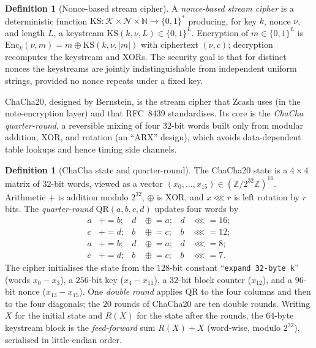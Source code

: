 \documentclass[11pt,a4paper]{article}
\theoremstyle{definition}
\newtheorem{definition}[theorem]{Definition}
\theoremstyle{remark}
\newcommand{\N}{\ensuremath{\mathbb{N}}}
\newcommand{\Z}{\ensuremath{\mathbb{Z}}}
\begin{document}
\begin{definition}[Nonce-based stream cipher]\label{symmetric:def-stream}
A \emph{nonce-based stream cipher} is a deterministic function \(\mathrm{KS} : \mathcal{K} \times \mathcal{N} \times \N \to \{0,1\}^\ast\) producing, for key \(k\), nonce \(\nu\), and length \(L\), a keystream \(\mathrm{KS}(k, \nu, L) \in \{0,1\}^L\). Encryption of \(m \in \{0,1\}^L\) is \(\mathrm{Enc}_k(\nu, m) = m \oplus \mathrm{KS}(k,\nu,|m|)\) with ciphertext \((\nu, c)\); decryption recomputes the keystream and XORs. The security goal is that for distinct nonces the keystreams are jointly indistinguishable from independent uniform strings, provided no nonce repeats under a fixed key.
\end{definition}

\textsf{ChaCha20}, designed by Bernstein, is the stream cipher that Zcash uses (in the note-encryption layer) and that RFC~8439 standardises. Its core is the \emph{ChaCha quarter-round}, a reversible mixing of four \(32\)-bit words built only from modular addition, XOR, and rotation (an ``ARX'' design), which avoids data-dependent table lookups and hence timing side channels.

\begin{definition}[ChaCha state and quarter-round]\label{symmetric:def-chacha}
The \textsf{ChaCha20} state is a \(4 \times 4\) matrix of \(32\)-bit words, viewed as a vector \((x_0, \dots, x_{15}) \in (\Z/2^{32}\Z)^{16}\). Arithmetic \(+\) is addition modulo \(2^{32}\), \(\oplus\) is XOR, and \(x \lll r\) is left rotation by \(r\) bits. The \emph{quarter-round} \(\mathrm{QR}(a,b,c,d)\) updates four words by
\[
  \begin{aligned}
    a &\mathrel{+}= b; & d &\mathrel{\oplus}= a; & d &\lll= 16; \\
    c &\mathrel{+}= d; & b &\mathrel{\oplus}= c; & b &\lll= 12; \\
    a &\mathrel{+}= b; & d &\mathrel{\oplus}= a; & d &\lll= 8; \\
    c &\mathrel{+}= d; & b &\mathrel{\oplus}= c; & b &\lll= 7.
  \end{aligned}
\]
The cipher initialises the state from the \(128\)-bit constant ``\texttt{expand 32-byte k}'' (words \(x_0\!-\!x_3\)), a \(256\)-bit key (\(x_4\!-\!x_{11}\)), a \(32\)-bit block counter (\(x_{12}\)), and a \(96\)-bit nonce (\(x_{13}\!-\!x_{15}\)). One \emph{double round} applies \(\mathrm{QR}\) to the four columns and then to the four diagonals; the \(20\) rounds of \textsf{ChaCha20} are ten double rounds. Writing \(X\) for the initial state and \(R(X)\) for the state after the rounds, the \(64\)-byte keystream block is the \emph{feed-forward} sum \(R(X) + X\) (word-wise, modulo \(2^{32}\)), serialised in little-endian order.
\end{definition}
\end{document}

